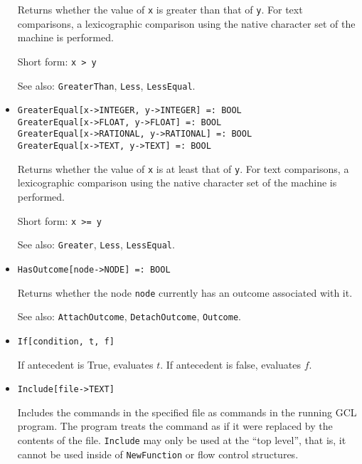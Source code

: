 \begin{itemize}
\bd
Returns whether the value of \verb+x+ is greater than
that of \verb+y+.  For text comparisons, a lexicographic comparison using the
native character set of the machine is performed.
\item
[Short form:] \verb+x > y+
\item
[See also:] {\tt GreaterThan}, {\tt Less}, {\tt LessEqual}.
\ed

\item
\protect \large \begin{verbatim}
GreaterEqual[x->INTEGER, y->INTEGER] =: BOOL
GreaterEqual[x->FLOAT, y->FLOAT] =: BOOL
GreaterEqual[x->RATIONAL, y->RATIONAL] =: BOOL
GreaterEqual[x->TEXT, y->TEXT] =: BOOL
\end{verbatim}\normalsize

\bd
Returns whether the value of \verb+x+ is at least that of
\verb+y+.  For text comparisons, a lexicographic comparison using the
native character set of the machine is performed.
\item
[Short form:] \verb+x >= y+
\item
[See also:] {\tt Greater}, {\tt Less}, {\tt LessEqual}.
\ed


\item
\protect \large \begin{verbatim}
HasOutcome[node->NODE] =: BOOL
\end{verbatim} \normalsize

\bd
Returns whether the node \verb+node+ currently has an outcome associated
with it.
\item
[See also:] {\tt AttachOutcome}, {\tt DetachOutcome}, {\tt Outcome}.
\ed


\item 
\protect \large \begin{verbatim}
If[condition, t, f]
\end{verbatim} \normalsize
  
\bd
If antecedent is True, evaluates $t$.  If
antecedent is false, evaluates $f$. 
\ed


\item
\protect \large \begin{verbatim}
Include[file->TEXT]
\end{verbatim}\normalsize

\bd
Includes the commands in the specified file as commands
in the running GCL program.  The program treats the command as if it
were replaced by the contents of the file.  \verb+Include+ may only be used
at the ``top level'', that is, it cannot be used inside of \verb+NewFunction+
or flow control structures.
\ed


\end{itemize}
